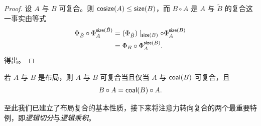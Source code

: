 \begin{proof}
    设 $A$ 与 $B$ 可复合。则 $\mathsf{cosize}(A) \leq \mathsf{size}(B)$，而 $B \circ A$ 是 $A$ 与 $\tilde{B}$ 的复合这一事实由等式
    \begin{align*}
        \Phi_{\tilde{B}} \circ \Phi_A^{\mathsf{size}(\tilde{B})} & = \left( \Phi_{\tilde{B}} \right) \mid_{\mathsf{size}(B)} \circ \Phi_A^{\mathsf{size}(B)}\\
        & = \Phi_B \circ \Phi_A^{\mathsf{size}(B)}.
    \end{align*}
    得出。
\end{proof}

\begin{corollary}\label{postcomposewithcoalesce}
    若 $A$ 与 $B$ 是布局，则 $A$ 与 $B$ 可复合当且仅当 $A$ 与 $\mathsf{coal}(B)$ 可复合，且
    \[
    B \circ A = \mathsf{coal}(B) \circ A.
    \]
\end{corollary}


至此我们已建立了布局复合的基本性质，接下来将注意力转向复合的两个最重要特例，即{\it 逻辑切分}与{\it 逻辑乘积}。
